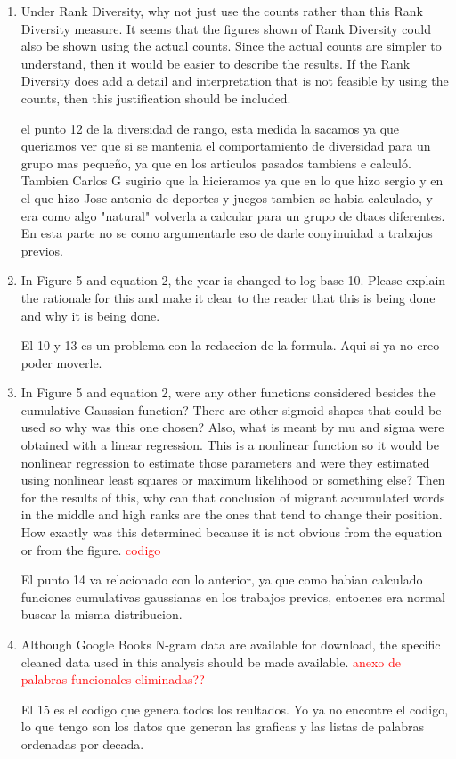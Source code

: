 \documentclass{article}
\begin{document}
\begin{enumerate}
\item Under Rank Diversity, why not just use the counts rather than this
Rank Diversity measure. It seems that the figures shown of Rank
Diversity could also be shown using the actual counts. Since the
actual counts are simpler to understand, then it would be easier to
describe the results. If the Rank Diversity does add a detail and
interpretation that is not feasible by using the counts, then this
justification should be included.


el punto 12 de la diversidad de rango, esta medida la sacamos ya que queriamos ver que si se mantenia el comportamiento de diversidad para un grupo mas pequeño, ya que en los articulos pasados tambiens e calculó. Tambien Carlos G sugirio que la hicieramos ya que en lo que hizo sergio y en el que hizo Jose antonio de deportes y juegos tambien se habia calculado, y era como algo "natural" volverla a calcular para un grupo de dtaos diferentes. En esta parte no se como  argumentarle eso de darle conyinuidad a trabajos previos.
\item  In Figure 5 and equation 2, the year is changed to log base 10. 
Please explain the rationale for this and make it clear to the reader
that this is being done and why it is being done.


El 10 y 13 es un problema con la redaccion de la formula. Aqui si ya no creo poder moverle.

\item  In Figure 5 and equation 2, were any other functions considered 
besides the cumulative Gaussian function? There are other sigmoid
shapes that could be used so why was this one chosen? Also, what is
meant by mu and sigma were obtained with a linear regression. This is
a nonlinear function so it would be nonlinear regression to estimate
those parameters and were they estimated using nonlinear least squares
or maximum likelihood or something else? Then for the results of this,
why can that conclusion of migrant accumulated words in the middle and
high ranks are the ones that tend to change their position. How
exactly was this determined because it is not obvious from the
equation or from the figure. \textcolor{red}{codigo}

El punto 14 va relacionado con lo anterior, ya que como habian calculado funciones cumulativas gaussianas en los trabajos previos, entocnes era normal buscar la misma distribucion.


\item  Although Google Books N-gram data are available for download, the
specific cleaned data used in this analysis should be made available. \textcolor{red}{anexo de palabras funcionales eliminadas??}


El 15 es el codigo que genera todos los reultados. Yo ya no encontre el codigo, lo que tengo son los datos que generan las graficas y las listas de palabras ordenadas por decada. 

\end{enumerate}
\end{document}
